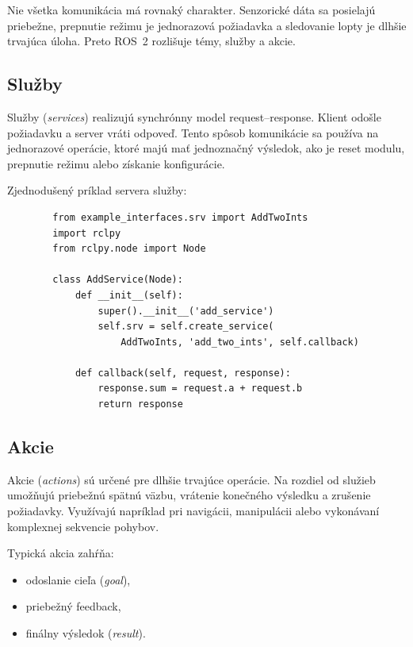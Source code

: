         Nie všetka komunikácia má rovnaký charakter. Senzorické dáta sa posielajú priebežne, prepnutie režimu je jednorazová požiadavka a sledovanie lopty je dlhšie trvajúca úloha. Preto ROS~2 rozlišuje témy, služby a akcie.
      
        \subsection*{Služby}
      
        Služby (\emph{services}) realizujú synchrónny model request--response. Klient odošle požiadavku a server vráti odpoveď. Tento spôsob komunikácie sa používa na jednorazové operácie, ktoré majú mať jednoznačný výsledok, ako je reset modulu, prepnutie režimu alebo získanie konfigurácie.
      
        Zjednodušený príklad servera služby:
      
        \begin{verbatim}
        from example_interfaces.srv import AddTwoInts
        import rclpy
        from rclpy.node import Node
      
        class AddService(Node):
            def __init__(self):
                super().__init__('add_service')
                self.srv = self.create_service(
                    AddTwoInts, 'add_two_ints', self.callback)
      
            def callback(self, request, response):
                response.sum = request.a + request.b
                return response
        \end{verbatim}
      
        \subsection*{Akcie}
      
        Akcie (\emph{actions}) sú určené pre dlhšie trvajúce operácie. Na rozdiel od služieb umožňujú priebežnú spätnú väzbu, vrátenie konečného výsledku a zrušenie požiadavky. Využívajú napríklad pri navigácii, manipulácii alebo vykonávaní komplexnej sekvencie pohybov.
      
        Typická akcia zahŕňa:
        \begin{itemize}
            \item odoslanie cieľa (\emph{goal}),
            \item priebežný feedback,
            \item finálny výsledok (\emph{result}).
        \end{itemize}
      
